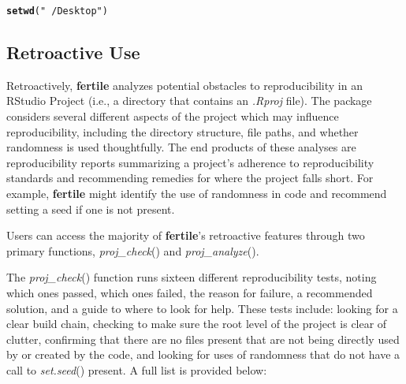 \documentclass[APA,LATO1COL]{WileyNJD-v2}\usepackage[]{graphicx}\usepackage[]{color}
\makeatletter
\newcommand{\hlstr}[1]{\textcolor[rgb]{0.192,0.494,0.8}{#1}}%
\newcommand{\hlstd}[1]{\textcolor[rgb]{0.345,0.345,0.345}{#1}}%
\newcommand{\hlkwd}[1]{\textcolor[rgb]{0.737,0.353,0.396}{\textbf{#1}}}%
\newenvironment{kframe}{%
 \def\at@end@of@kframe{}%
 \ifinner\ifhmode%
  \def\at@end@of@kframe{\end{minipage}}%
  \begin{minipage}{\columnwidth}%
 \fi\fi%
 \def\FrameCommand##1{\hskip\@totalleftmargin \hskip-\fboxsep
 \colorbox{shadecolor}{##1}\hskip-\fboxsep
     \hskip-\linewidth \hskip-\@totalleftmargin \hskip\columnwidth}%
 \MakeFramed {\advance\hsize-\width
   \@totalleftmargin\z@ \linewidth\hsize
   \@setminipage}}%
 {\par\unskip\endMakeFramed%
 \at@end@of@kframe}
\newenvironment{knitrout}{}{} %
\newcommand{\cmd}[1]{\textit{#1}}
\newcommand{\pkg}[1]{\textbf{#1}}
\newcommand{\func}[1]{\textit{#1}()}
\makeatother
\begin{document}
\begin{knitrout}
\color{fgcolor}\begin{kframe}
\begin{alltt}
\hlkwd{setwd}\hlstd{(}\hlstr{"~/Desktop"}\hlstd{)}
\end{alltt}


{\ttfamily\noindent\bfseries\color{errorcolor}{\#\# Error: setwd() is likely to break reproducibility. Use here::here() instead.}}\end{kframe}
\end{knitrout}


\subsection{Retroactive Use}

Retroactively, \pkg{fertile} analyzes potential obstacles to reproducibility in an RStudio Project (i.e., a directory that contains an \cmd{.Rproj} file). The package considers several different aspects of the project which may influence reproducibility, including the directory structure, file paths, and whether randomness is used thoughtfully.
The end products of these analyses are reproducibility reports summarizing a project's adherence to reproducibility standards and recommending remedies for where the project falls short. For example, \pkg{fertile} might identify the use of randomness in code and recommend setting a seed if one is not present.

Users can access the majority of \pkg{fertile}'s retroactive features through two primary functions, \func{proj\_check} and \func{proj\_analyze}. 

The \func{proj\_check} function runs sixteen different reproducibility tests, noting which ones passed, which ones failed, the reason for failure, a recommended solution, and a guide to where to look for help. These tests include: looking for a clear build chain, checking to make sure the root level of the project is clear of clutter, confirming that there are no files present that are not being directly used by or created by the code, and looking for uses of randomness that do not have a call to \func{set.seed} present. A full list is provided below:

\vspace{2mm}
\end{document}
